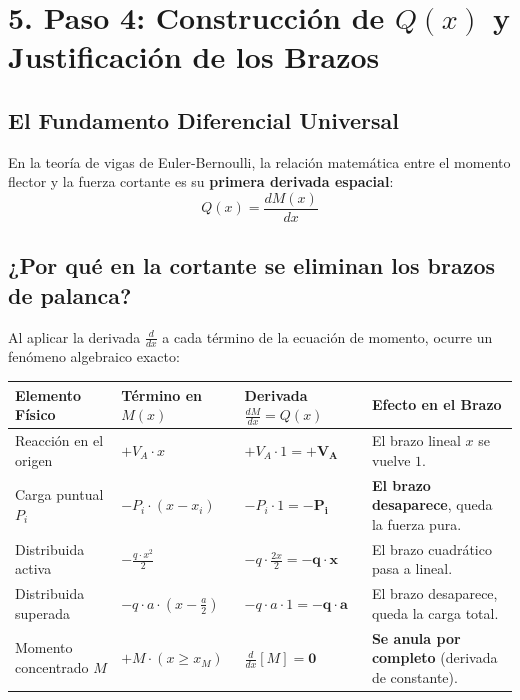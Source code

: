 \documentclass[10pt,a4paper]{article}
\begin{document}
\vspace{6pt}

\section{\color{NavyBlue}5. Paso 4: Construcción de $Q(x)$ y Justificación de los Brazos}

\subsection{El Fundamento Diferencial Universal}
En la teoría de vigas de Euler-Bernoulli, la relación matemática entre el momento flector y la fuerza cortante es su \textbf{primera derivada espacial}:
\begin{equation}
    Q(x) = \frac{dM(x)}{dx}
\end{equation}

\subsection{¿Por qué en la cortante se eliminan los brazos de palanca?}
Al aplicar la derivada $\frac{d}{dx}$ a cada término de la ecuación de momento, ocurre un fenómeno algebraico exacto:

\begin{table}[h!]
\centering
\small
\begin{tabularx}{\textwidth}{p{4.2cm}p{4.2cm}p{3.8cm}X}
\toprule
\textbf{Elemento Físico} & \textbf{Término en $M(x)$} & \textbf{Derivada $\frac{dM}{dx} = Q(x)$} & \textbf{Efecto en el Brazo} \\
\midrule
Reacción en el origen & $+ V_A \cdot x$ & $+ V_A \cdot 1 = \mathbf{+ V_A}$ & El brazo lineal $x$ se vuelve $1$. \\
Carga puntual $P_i$ & $- P_i \cdot (x - x_i)$ & $- P_i \cdot 1 = \mathbf{- P_i}$ & \textbf{El brazo desaparece}, queda la fuerza pura. \\
Distribuida activa & $-\frac{q \cdot x^2}{2}$ & $- q \cdot \frac{2x}{2} = \mathbf{- q \cdot x}$ & El brazo cuadrático pasa a lineal. \\
Distribuida superada & $- q \cdot a \cdot \left(x - \frac{a}{2}\right)$ & $- q \cdot a \cdot 1 = \mathbf{- q \cdot a}$ & El brazo desaparece, queda la carga total. \\
Momento concentrado $M$ & $+ M \cdot (x \ge x_M)$ & $\frac{d}{dx}[M] = \mathbf{0}$ & \textbf{Se anula por completo} (derivada de constante). \\
\bottomrule
\end{tabularx}
\end{table}
\end{document}
